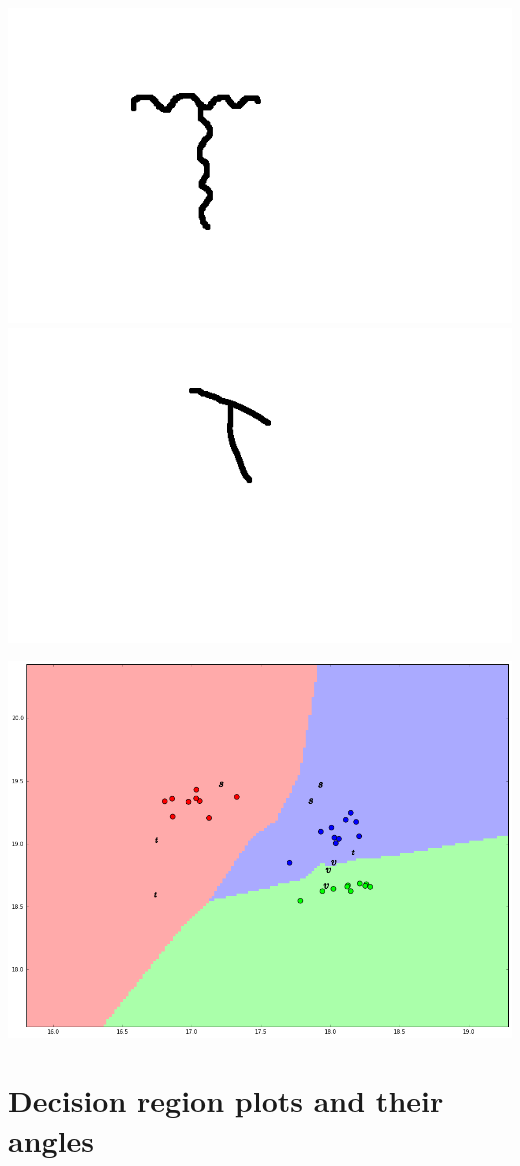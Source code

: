 \documentclass[a4paper,12px,twocolumn]{article}
\begin{document}
\begin{flushleft}
        \includegraphics[scale=0.1]{tT12}
        \includegraphics[scale=0.1]{tT13}

        \includegraphics[scale=0.25]{extremechars}




\section{Decision region plots and their angles}

\end{flushleft}
\end{document}
